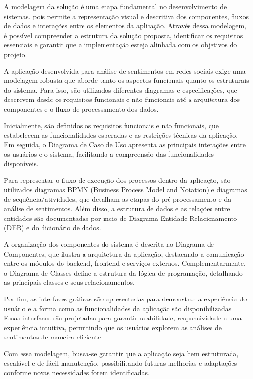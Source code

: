 \documentclass[
	12pt,				%
	oneside,			%
	a4paper,			%
	english,			%
	french,				%
	spanish,			%
	brazil				%
	]{abntex2}
\begin{document}
A modelagem da solução é uma etapa fundamental no desenvolvimento de
sistemas, pois permite a representação visual e descritiva dos
componentes, fluxos de dados e interações entre os elementos da
aplicação. Através dessa modelagem, é possível compreender a estrutura
da solução proposta, identificar os requisitos essenciais e garantir que
a implementação esteja alinhada com os objetivos do projeto.

A aplicação desenvolvida para análise de sentimentos em redes sociais
exige uma modelagem robusta que aborde tanto os aspectos funcionais
quanto os estruturais do sistema. Para isso, são utilizados diferentes
diagramas e especificações, que descrevem desde os requisitos funcionais
e não funcionais até a arquitetura dos componentes e o fluxo de
processamento dos dados.

Inicialmente, são definidos os requisitos funcionais e não funcionais,
que estabelecem as funcionalidades esperadas e as restrições técnicas da
aplicação. Em seguida, o Diagrama de Caso de Uso apresenta as principais
interações entre os usuários e o sistema, facilitando a compreensão das
funcionalidades disponíveis.

Para representar o fluxo de execução dos processos dentro da aplicação,
são utilizados diagramas BPMN (Business Process Model and Notation) e
diagramas de sequência/atividades, que detalham as etapas do
pré-processamento e da análise de sentimentos. Além disso, a estrutura
de dados e as relações entre entidades são documentadas por meio do
Diagrama Entidade-Relacionamento (DER) e do dicionário de dados.

A organização dos componentes do sistema é descrita no Diagrama de
Componentes, que ilustra a arquitetura da aplicação, destacando a
comunicação entre os módulos do backend, frontend e serviços externos.
Complementarmente, o Diagrama de Classes define a estrutura da lógica de
programação, detalhando as principais classes e seus relacionamentos.

Por fim, as interfaces gráficas são apresentadas para demonstrar a
experiência do usuário e a forma como as funcionalidades da aplicação
são disponibilizadas. Essas interfaces são projetadas para garantir
usabilidade, responsividade e uma experiência intuitiva, permitindo que
os usuários explorem as análises de sentimentos de maneira eficiente.

Com essa modelagem, busca-se garantir que a aplicação seja bem
estruturada, escalável e de fácil manutenção, possibilitando futuras
melhorias e adaptações conforme novas necessidades forem identificadas.
\end{document}
